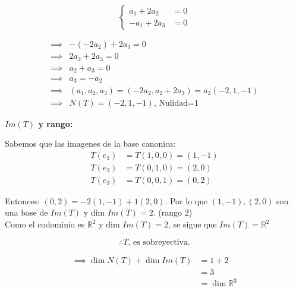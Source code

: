 \documentclass{article}
\begin{document}
\begin{enumerate}
			\begin{equation*}
				\begin{cases}
					a_1+2a_2 &=0 \\
					-a_1+2a_3 &=0
				\end{cases}
			\end{equation*}
			
			\begin{equation*}
				\begin{aligned}
					\implies& -(-2a_2)+2a_3 =0 \\
					\implies&2a_2+2a_3     =0 \\
					\implies& a_2+a_3       =0 \\
					\implies& a_3           =-a_2\\
					\implies& (a_1,a_2,a_3) =(-2a_2,a_2+2a_3) 
										   =a_2(-2,1,-1) \\
					\implies& N(T)=(-2,1,-1) \text{, Nulidad=1}
				\end{aligned}
			\end{equation*}
			
			\textbf{\(Im(T)\) y rango:}
			
			Sabemos que las imagenes de la base canonica: \\
			\begin{equation*}
				\begin{aligned}
					T(e_1) &=T(1,0,0) 
						    =(1,-1) \\
					T(e_2) &=T(0,1,0) 
						    =(2,0) \\
					T(e_3) &=T(0,0,1) 
						    =(0,2)
				\end{aligned}
			\end{equation*}
			
			Entonces: \((0,2) = -2(1,-1) + 1(2,0)\). Por lo que \((1,-1),(2,0)\) son una base de \(Im(T)\) y dim \(Im(T)=2\). (rango 2)\\
			Como el codominio es \(\mathbb{R}^2\) y dim \(Im(T)=2\), se sigue que \(Im(T)=\mathbb{R}^2\)
			
			\[
			\boxed{\therefore T \text{, es sobreyectiva.}} 
			\]
			
			\begin{equation*}
				\begin{aligned}
					\implies \dim N(T) + \dim Im (T) &=1+2 \\
													 &= 3 \\
												 	 &=\dim \mathbb{R}^3
				\end{aligned}
			\end{equation*}
			

\end{enumerate}
\end{document}

